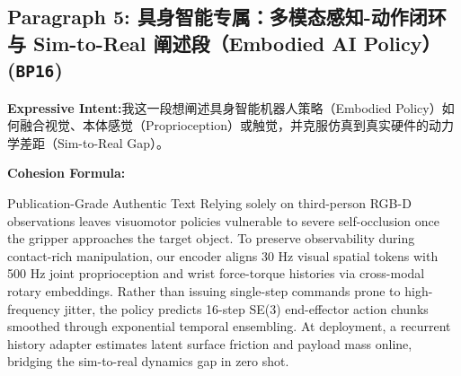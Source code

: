 \subsection*{Paragraph 5: 具身智能专属：多模态感知-动作闭环与 Sim-to-Real 阐述段（Embodied AI Policy） (\texttt{BP16})}
\noindent\textbf{Expressive Intent:}\enspace 我这一段想阐述具身智能机器人策略（Embodied Policy）如何融合视觉、本体感觉（Proprioception）或触觉，并克服仿真到真实硬件的动力学差距（Sim-to-Real Gap）。\par
\noindent\textbf{Cohesion Formula:}\par\vspace{4pt}
\begin{ExampleBox}{Publication-Grade Authentic Text}
Relying solely on third-person RGB-D observations leaves visuomotor policies vulnerable to severe self-occlusion once the gripper approaches the target object. To preserve observability during contact-rich manipulation, our encoder aligns 30 Hz visual spatial tokens with 500 Hz joint proprioception and wrist force-torque histories via cross-modal rotary embeddings. Rather than issuing single-step commands prone to high-frequency jitter, the policy predicts 16-step SE(3) end-effector action chunks smoothed through exponential temporal ensembling. At deployment, a recurrent history adapter estimates latent surface friction and payload mass online, bridging the sim-to-real dynamics gap in zero shot.
\end{ExampleBox}
